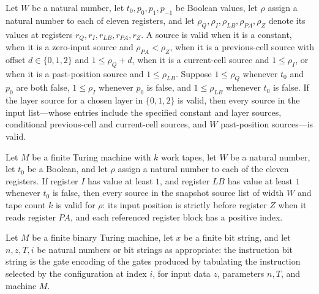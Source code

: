\begin{theorem}
\label{Complexity.UTab.ok_inpS}
\leanok
{}
Let $W$ be a natural number, let $t_0,p_0,p_1,p_{-1}$ be Boolean values, let $\rho$
assign a natural number to each of eleven registers, and let
$\rho_Q,\rho_I,\rho_{LB},\rho_{PA},\rho_Z$ denote its values at registers
$r_Q,r_I,r_{LB},r_{PA},r_Z$. A source is valid when it is a constant, when it is a
zero-input source and $\rho_{PA}<\rho_Z$, when it is a previous-cell source with offset
$d\in\{0,1,2\}$ and $1\leq\rho_Q+d$, when it is a current-cell source and $1\leq\rho_I$,
or when it is a past-position source and $1\leq\rho_{LB}$. Suppose $1\leq\rho_Q$
whenever $t_0$ and $p_0$ are both false, $1\leq\rho_I$ whenever $p_0$ is false, and
$1\leq\rho_{LB}$ whenever $t_0$ is false. If the layer source for a chosen layer in
$\{0,1,2\}$ is valid, then every source in the input list—whose entries include the
specified constant and layer sources, conditional previous-cell and current-cell
sources, and $W$ past-position sources—is valid.
\end{theorem}

\begin{theorem}
\label{Complexity.UTab.ok_snapS}
\leanok
{}
Let $M$ be a finite Turing machine with $k$ work tapes, let $W$ be a natural number, let
$t_0$ be a Boolean, and let $\rho$ assign a natural number to each of the eleven
registers. If register $I$ has value at least $1$, and register $LB$ has value at least
$1$ whenever $t_0$ is false, then every source in the snapshot source list of width $W$
and tape count $k$ is valid for $\rho$: its input position is strictly before register
$Z$ when it reads register $PA$, and each referenced register block has a positive
index.
\end{theorem}

\begin{definition}
\label{Complexity.UTab.ibits}
\leanok
{}
Let $M$ be a finite binary Turing machine, let $x$ be a finite bit string, and let
$n,z,T,i$ be natural numbers or bit strings as appropriate: the instruction bit string
is the gate encoding of the gates produced by tabulating the instruction selected by the
configuration at index $i$, for input data $z$, parameters $n,T$, and machine $M$.
\end{definition}

